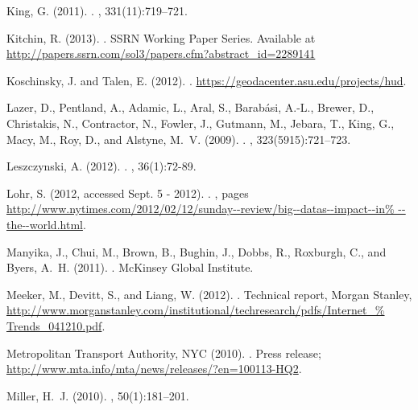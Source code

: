 \documentclass[12pt]{article}
\begin{document}
\begin{thebibliography}{00}
King, G. (2011).
.
, 331(11):719--721.

Kitchin, R. (2013).
.
\newblock SSRN Working Paper Series. Available at
\url{http://papers.ssrn.com/sol3/papers.cfm?abstract\_id=2289141}

Koschinsky, J. and Talen, E. (2012).
.
\newblock \url{https://geodacenter.asu.edu/projects/hud}.

Lazer, D., Pentland, A., Adamic, L., Aral, S., Barab{\'a}si, A.-L., Brewer, D.,
  Christakis, N., Contractor, N., Fowler, J., Gutmann, M., Jebara, T., King,
  G., Macy, M., Roy, D., and Alstyne, M.~V. (2009).
.
, 323(5915):721--723.

Leszczynski, A. (2012).
.
, 36(1):72-89.

Lohr, S. (2012, accessed Sept. 5 - 2012).
.
, pages
  \url{http://www.nytimes.com/2012/02/12/sunday--review/big--datas--impact--in%
--the--world.html}.

Manyika, J., Chui, M., Brown, B., Bughin, J., Dobbs, R., Roxburgh, C., and
  Byers, A.~H. (2011).
.
\newblock McKinsey Global Institute.

Meeker, M., Devitt, S., and Liang, W. (2012).
.
\newblock Technical report, Morgan Stanley,
  \url{http://www.morganstanley.com/institutional/techresearch/pdfs/Internet\_%
Trends\_041210.pdf}.

{Metropolitan Transport Authority, NYC} (2010).
.
\newblock Press release;
  \url{http://www.mta.info/mta/news/releases/?en=100113-HQ2}.

Miller, H.~J. (2010).
, 50(1):181--201.


\end{thebibliography}
\end{document}
